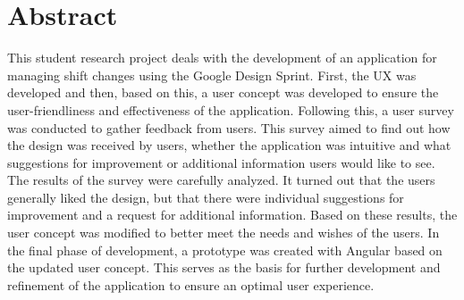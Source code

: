\section*{Abstract}

This student research project deals with the development of an application for managing shift changes using the Google Design Sprint. 
First, the UX was developed and then, based on this, a user concept was developed to ensure the user-friendliness and effectiveness of the application. 
Following this, a user survey was conducted to gather feedback from users. This survey aimed to find out how the design was received by users, whether the application was intuitive and what suggestions for improvement or additional information users would like to see. The results of the survey were carefully analyzed. It turned out that the users generally liked the design, but that there were individual suggestions for improvement and a request for additional information. Based on these results, the user concept was modified to better meet the needs and wishes of the users. In the final phase of development, a prototype was created with Angular based on the updated user concept. This serves as the basis for further development and refinement of the application to ensure an optimal user experience.
